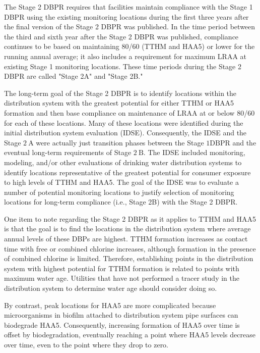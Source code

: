 \documentclass[10pt]{article}
\begin{document}
The Stage 2 DBPR requires that facilities maintain compliance with the Stage 1 DBPR using the existing monitoring locations during the first three years after the final version of the Stage 2 DBPR was published. In the time period between the third and sixth year after the Stage 2 DBPR was published, compliance continues to be based on maintaining 80/60 (TTHM and HAA5) or lower for the running annual average; it also includes a requirement for maximum LRAA at existing Stage 1 monitoring locations. These time periods during the Stage 2 DBPR are called "Stage 2A" and "Stage 2B."

The long-term goal of the Stage 2 DBPR is to identify locations within the distribution system with the greatest potential for either TTHM or HAA5 formation and then base compliance on maintenance of LRAA at or below 80/60 for each of these locations. Many of these locations were identified during the initial distribution system evaluation (IDSE). Consequently, the IDSE and the Stage $2 \mathrm{~A}$ were actually just transition phases between the Stage $1 \mathrm{DBPR}$ and the eventual long-term requirements of Stage $2 \mathrm{~B}$. The IDSE included monitoring, modeling, and/or other evaluations of drinking water distribution systems to identify locations representative of the greatest potential for consumer exposure to high levels of TTHM and HAA5. The goal of the IDSE was to evaluate a number of potential monitoring locations to justify selection of monitoring locations for long-term compliance (i.e., Stage 2B) with the Stage 2 DBPR.

One item to note regarding the Stage 2 DBPR as it applies to TTHM and HAA5 is that the goal is to find the locations in the distribution system where average annual levels of these DBPs are highest. TTHM formation increases as contact time with free or combined chlorine increases, although formation in the presence of combined chlorine is limited. Therefore, establishing points in the distribution system with highest potential for TTHM formation is related to points with maximum water age. Utilities that have not performed a tracer study in the distribution system to determine water age should consider doing so.

By contrast, peak locations for HAA5 are more complicated because microorganisms in biofilm attached to distribution system pipe surfaces can biodegrade HAA5. Consequently, increasing formation of HAA5 over time is offset by biodegradation, eventually reaching a point where HAA5 levels decrease over time, even to the point where they drop to zero.
\end{document}
